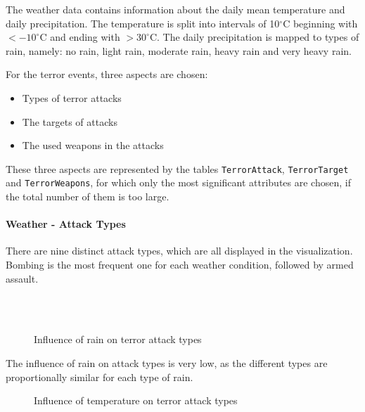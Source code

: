 The weather data contains information about the daily mean temperature and daily precipitation. The temperature is split into intervals of 10$^\circ$C beginning with $< -10^\circ$C and ending with $> 30^\circ$C. The daily precipitation is mapped to types of rain, namely: no rain, light rain, moderate rain, heavy rain and very heavy rain.

For the terror events, three aspects are chosen:
\begin{itemize}
	\item Types of terror attacks
	\item The targets of attacks
	\item The used weapons in the attacks
\end{itemize}

These three aspects are represented by the tables \texttt{TerrorAttack}, \texttt{TerrorTarget} and \texttt{TerrorWeapons}, for which only the most significant attributes are chosen, if the total number of them is too large.

\paragraph{Weather - Attack Types}
There are nine distinct attack types, which are all displayed in the visualization. Bombing is the most frequent one for each weather condition, followed by armed assault.

\begin{figure}[!ht]
\centering
    \qquad\\
    \qquad
    \qquad\\
    \qquad
\caption{Influence of rain on terror attack types}
\end{figure}

The influence of rain on attack types is very low, as the different types are proportionally similar for each type of rain.

\newpage

\begin{figure}[!ht]
\centering
    \qquad
    \qquad
    \qquad
    \qquad
    \qquad
\caption{Influence of temperature on terror attack types}
\label{fig:example subfigure}
\end{figure}

